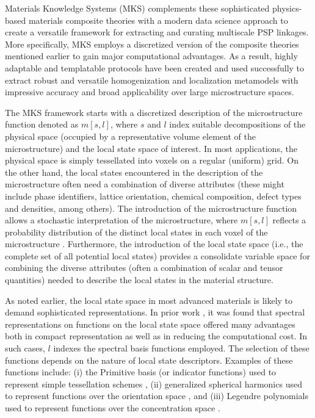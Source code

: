 \documentclass{bmcart}
\begin{document}
 Materials Knowledge Systems (MKS) \cite{landi2010multi, kalidindi2010novel, yabansu2014calibrated, al2012multi, kalidindi2011microstructure, gupta2015structure,  cceccen2014data} complements these sophisticated physics-based materials composite theories with a modern data science approach to create a versatile framework for extracting and curating multiscale PSP linkages. More specifically, MKS employs a discretized version of the composite theories mentioned earlier to gain major computational advantages. As a result, highly adaptable and templatable protocols have been created and used successfully to extract robust and versatile homogenization and localization metamodels with impressive accuracy and broad applicability over large microstructure spaces.
 
 The MKS framework starts with a discretized description of the microstructure function denoted as $m[s, l]$, where $s$ and $l$ index suitable decompositions of the physical space (occupied by a representative volume element of the microstructure) and the local state space of interest. In most applications, the physical space is simply tessellated into voxels on a regular (uniform) grid. On the other hand, the local states encountered in the description of the microstructure often need a combination of diverse attributes (these might include phase identifiers, lattice orientation, chemical composition, defect types and densities, among others). The introduction of the microstructure function allows a stochastic interpretation of the microstructure, where $m[s, l]$ reflects a probability distribution of the distinct local states in each voxel of the microstructure \cite{niezgoda2013novel, niezgoda2011understanding, qidwai2012estimating,niezgoda2010optimized}. Furthermore, the introduction of the local state space (i.e., the complete set of all potential local states) provides a consolidate variable space for combining the diverse attributes (often a combination of scalar and tensor quantities)  needed to describe the  local states in the material structure.   
 
 As noted earlier, the local state space in most advanced materials is likely to demand sophisticated representations. In prior work \cite{yabansu2014calibrated, yabansu2015representation, brough2016microstructure}, it was found that spectral representations on functions on the local state space offered many advantages both in compact representation as well as in reducing the computational cost. In such cases, $l$ indexes the spectral basis functions employed. The selection of these functions depends on the nature of local state descriptors. Examples of these functions include: (i) the Primitive basis (or indicator functions) used to represent simple tessellation schemes \cite{landi2010multi, kalidindi2010novel, al2012multi, kalidindi2011microstructure, gupta2015structure,  cceccen2014data, niezgoda2013novel, niezgoda2011understanding, cecen2016versatile}, (ii) generalized spherical harmonics used to represent functions over the orientation space \cite{yabansu2014calibrated, yabansu2015representation}, and (iii) Legendre polynomials used to represent functions over the concentration space \cite{brough2016microstructure}.
 
\end{document}
